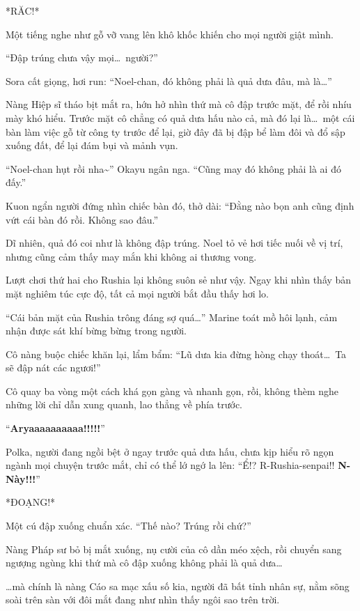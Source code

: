 \documentclass[../main.tex]{subfiles}
\begin{document}
*RĂC!*

Một tiếng nghe như gỗ vỡ vang lên khô khốc khiến cho mọi người giật mình.

``Đập trúng chưa vậy mọi\dots\ người?''

Sora cất giọng, hơi run: ``Noel-chan, đó không phải là quả dưa đâu, mà là\dots''

Nàng Hiệp sĩ tháo bịt mắt ra, hớn hở nhìn thứ mà cô đập trước mặt, để rồi nhíu mày khó hiểu. Trước mặt cô chẳng có quả dưa hấu nào cả, mà đó lại là\dots\ một cái bàn làm việc gỗ từ công ty trước để lại, giờ đây đã bị đập bể làm đôi và đổ sập xuống đất, để lại đám bụi và mảnh vụn.

``Noel-chan hụt rồi nha\~{}'' Okayu ngân nga. ``Cũng may đó không phải là ai đó đấy.''

Kuon ngẩn người đứng nhìn chiếc bàn đó, thở dài: ``Đằng nào bọn anh cũng định vứt cái bàn đó rồi. Không sao đâu.''

Dĩ nhiên, quả đó coi như là không đập trúng. Noel tỏ vẻ hơi tiếc nuối về vị trí, nhưng cũng cảm thấy may mắn khi không ai thương vong.

\ct

Lượt chơi thứ hai cho Rushia lại không suôn sẻ như vậy. Ngay khi nhìn thấy bản mặt nghiêm túc cực độ, tất cả mọi người bắt đầu thấy hơi lo.

``Cái bản mặt của Rushia trông đáng sợ quá\dots'' Marine toát mồ hôi lạnh, cảm nhận được sát khí bừng bừng trong người.

Cô nàng buộc chiếc khăn lại, lẩm bẩm: ``Lũ dưa kia đừng hòng chạy thoát\dots\ Ta sẽ đập nát các ngươi!''

Cô quay ba vòng một cách khá gọn gàng và nhanh gọn, rồi, không thèm nghe những lời chỉ dẫn xung quanh, lao thẳng về phía trước.

``\textbf{Aryaaaaaaaaaa!!!!!}''

Polka, người đang ngồi bệt ở ngay trước quả dưa hấu, chưa kịp hiểu rõ ngọn ngành mọi chuyện trước mắt, chỉ có thể lớ ngớ la lên: ``Ể!? R-Rushia-senpai!! \textbf{N-Này!!!}''

*ĐOẠNG!*

Một cú đập xuống chuẩn xác. ``Thế nào? Trúng rồi chứ?''

Nàng Pháp sư bỏ bị mắt xuống, nụ cười của cô dần méo xệch, rồi chuyển sang ngượng ngùng khi thứ mà cô đập xuống không phải là quả dưa\dots

\dots mà chính là nàng Cáo sa mạc xấu số kia, người đã bất tỉnh nhân sự, nằm sõng soài trên sàn với đôi mắt đang như nhìn thấy ngôi sao trên trời.
\end{document}
